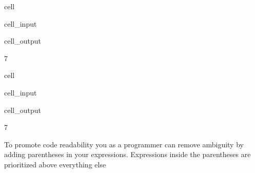 \documentclass[letterpaper,10pt,english]{jupyterBook}
\begin{document}
\begin{sphinxuseclass}{cell}\begin{sphinxVerbatimInput}

\begin{sphinxuseclass}{cell_input}
\begin{sphinxVerbatim}[commandchars=\\\{\}]
     
\end{sphinxVerbatim}

\end{sphinxuseclass}\end{sphinxVerbatimInput}
\begin{sphinxVerbatimOutput}

\begin{sphinxuseclass}{cell_output}
\begin{sphinxVerbatim}[commandchars=\\\{\}]
7
\end{sphinxVerbatim}

\end{sphinxuseclass}\end{sphinxVerbatimOutput}

\end{sphinxuseclass}
\begin{sphinxuseclass}{cell}\begin{sphinxVerbatimInput}

\begin{sphinxuseclass}{cell_input}
\begin{sphinxVerbatim}[commandchars=\\\{\}]
    
\end{sphinxVerbatim}

\end{sphinxuseclass}\end{sphinxVerbatimInput}
\begin{sphinxVerbatimOutput}

\begin{sphinxuseclass}{cell_output}
\begin{sphinxVerbatim}[commandchars=\\\{\}]
7
\end{sphinxVerbatim}

\end{sphinxuseclass}\end{sphinxVerbatimOutput}

\end{sphinxuseclass}
\sphinxAtStartPar
To promote code readability you as a programmer can remove ambiguity by adding parentheses in your expressions. Expressions inside the  parentheses are prioritized above everything else
\end{document}
